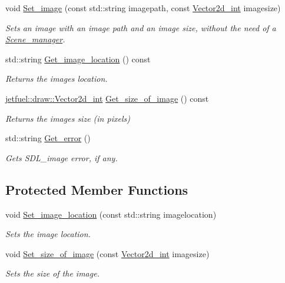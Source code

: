 \begin{DoxyCompactItemize}
void \hyperlink{classjetfuel_1_1draw_1_1Image_a4b445f5105eaed28d9a18d6bf3ed44bb}{Set\+\_\+image} (const std\+::string imagepath, const \hyperlink{classjetfuel_1_1draw_1_1Vector2d}{Vector2d\+\_\+int} imagesize)
\begin{DoxyCompactList}\small\item\em Sets an image with an image path and an image size, without the need of a \hyperlink{classjetfuel_1_1draw_1_1Scene__manager}{Scene\+\_\+manager}. \end{DoxyCompactList}\item 
std\+::string \hyperlink{classjetfuel_1_1draw_1_1Image_afe13a343f0ca098c2f258511fa6a2f2b}{Get\+\_\+image\+\_\+location} () const
\begin{DoxyCompactList}\small\item\em Returns the image\textquotesingle{}s location. \end{DoxyCompactList}\item 
\hyperlink{classjetfuel_1_1draw_1_1Vector2d}{jetfuel\+::draw\+::\+Vector2d\+\_\+int} \hyperlink{classjetfuel_1_1draw_1_1Image_a69eb09128ebcbf427eac516d0c042ce5}{Get\+\_\+size\+\_\+of\+\_\+image} () const
\begin{DoxyCompactList}\small\item\em Returns the image\textquotesingle{}s size (in pixels) \end{DoxyCompactList}\item 
std\+::string \hyperlink{classjetfuel_1_1draw_1_1Image_a4014f980cf67b0716b57b48f7a98020e}{Get\+\_\+error} ()
\begin{DoxyCompactList}\small\item\em Gets S\+D\+L\+\_\+image error, if any. \end{DoxyCompactList}\end{DoxyCompactItemize}
\subsection*{Protected Member Functions}
\begin{DoxyCompactItemize}
\item 
void \hyperlink{classjetfuel_1_1draw_1_1Image_a0426e7dcc92eb1220cc8d1a508bdcca8}{Set\+\_\+image\+\_\+location} (const std\+::string imagelocation)
\begin{DoxyCompactList}\small\item\em Sets the image location. \end{DoxyCompactList}\item 
void \hyperlink{classjetfuel_1_1draw_1_1Image_a9252d59e532f26b94572f155c4d4b118}{Set\+\_\+size\+\_\+of\+\_\+image} (const \hyperlink{classjetfuel_1_1draw_1_1Vector2d}{Vector2d\+\_\+int} imagesize)
\begin{DoxyCompactList}\small\item\em Sets the size of the image. \end{DoxyCompactList}\end{DoxyCompactItemize}


